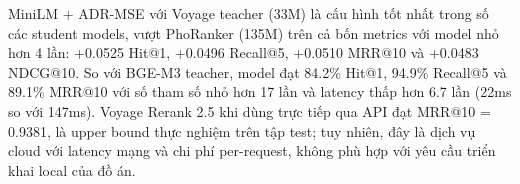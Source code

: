 \documentclass[../DoAn.tex]{subfiles}
\begin{document}
\begin{table}[H]
    \centering
    \caption{So sánh MiniLM-ADR-MSE với các baselines}
    \label{tab:reranker-baselines}
    {\small
    \setlength{\tabcolsep}{3pt}
    }
\end{table}

MiniLM + ADR-MSE với Voyage teacher (33M) là cấu hình tốt nhất trong số các student models, vượt PhoRanker (135M) trên cả bốn metrics với model nhỏ hơn 4 lần: +0.0525 Hit@1, +0.0496 Recall@5, +0.0510 MRR@10 và +0.0483 NDCG@10. So với BGE-M3 teacher, model đạt 84.2\% Hit@1, 94.9\% Recall@5 và 89.1\% MRR@10 với số tham số nhỏ hơn 17 lần và latency thấp hơn 6.7 lần (22ms so với 147ms). Voyage Rerank 2.5 khi dùng trực tiếp qua API đạt MRR@10 = 0.9381, là upper bound thực nghiệm trên tập test; tuy nhiên, đây là dịch vụ cloud với latency mạng và chi phí per-request, không phù hợp với yêu cầu triển khai local của đồ án.
\end{document}
